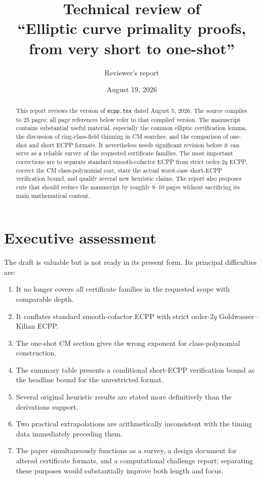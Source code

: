 \documentclass[11pt]{amsart}
\begin{document}
\title[Review of the ECPP survey]{Technical review of\\
``Elliptic curve primality proofs, from very short to one-shot''}
\author{Reviewer's report}
\date{August 19, 2026}

\begin{abstract}
This report reviews the version of \texttt{ecpp.tex} dated August 5, 2026.  The source compiles to 25 pages; all page references below refer to that compiled version.  The manuscript contains substantial useful material, especially the common elliptic certification lemma, the discussion of ring-class-field thinning in CM searches, and the comparison of one-shot and short ECPP formats.  It nevertheless needs significant revision before it can serve as a reliable survey of the requested certificate families.  The most important corrections are to separate standard smooth-cofactor ECPP from strict order-$2q$ ECPP, correct the CM class-polynomial cost, state the actual worst-case short-ECPP verification bound, and qualify several new heuristic claims.  The report also proposes cuts that should reduce the manuscript by roughly 8--10 pages without sacrificing its main mathematical content.
\end{abstract}

\maketitle
\tableofcontents

\section{Executive assessment}

The draft is valuable but is not ready in its present form.  Its principal difficulties are:

\begin{enumerate}
\item It no longer covers all certificate families in the requested scope with comparable depth.
\item It conflates standard smooth-cofactor ECPP with strict order-$2q$ Goldwasser--Kilian ECPP.
\item The one-shot CM section gives the wrong exponent for class-polynomial construction.
\item The summary table presents a conditional short-ECPP verification bound as the headline bound for the unrestricted format.
\item Several original heuristic results are stated more definitively than the derivations support.
\item Two practical extrapolations are arithmetically inconsistent with the timing data immediately preceding them.
\item The paper simultaneously functions as a survey, a design document for altered certificate formats, and a computational challenge report; separating these purposes would substantially improve both length and focus.
\end{enumerate}
\end{document}
